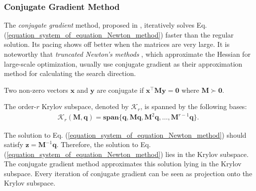 \documentclass[lang=cn,10pt]{gorgeousnbook}
\numberwithin{equation}{section}%
\numberwithin{figure}{section}%
\begin{document}
\subsubsection{Conjugate Gradient Method}


The \textit{conjugate gradient} method, proposed in \cite{hestenes1952methods}, iteratively solves Eq. (\ref{equation_system_of_equation_Newton_method}) faster than the regular solution. Its pacing shows off better when the matrices are very large. 
It is noteworthy that \textit{truncated Newton's methods} \cite{nash2000survey}, which approximate the Hessian for large-scale optimization, usually use conjugate gradient as their approximation method for calculating the search direction. %

\begin{definition}
Two non-zero vectors $\boldsymbol{x}$ and $\boldsymbol{y}$ are conjugate if $\boldsymbol{x}^\top \boldsymbol{M} \boldsymbol{y} = \boldsymbol{0}$ where $\boldsymbol{M} \succ \boldsymbol{0}$.
\end{definition}

\begin{definition}
The order-$r$ Krylov subspace, denoted by $\mathcal{K}_r$, is spanned by the following bases:
\begin{align}
\mathcal{K}_r(\boldsymbol{M},\boldsymbol{q}) = \textbf{span}\{\boldsymbol{q}, \boldsymbol{Mq}, \boldsymbol{M}^2\boldsymbol{q}, \dots, \boldsymbol{M}^{r-1}\boldsymbol{q}\}.
\end{align}
\end{definition}
The solution to Eq. (\ref{equation_system_of_equation_Newton_method}) should satisfy $\boldsymbol{z} = \boldsymbol{M}^{-1}\boldsymbol{q}$. Therefore, the solution to Eq. (\ref{equation_system_of_equation_Newton_method}) lies in the Krylov subspace. The conjugate gradient method approximates this solution lying in the Krylov subspace. Every iteration of conjugate gradient can be seen as projection onto the Krylov subspace.
\end{document}
